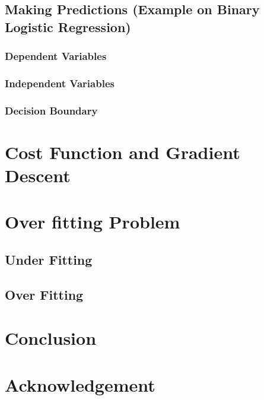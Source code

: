 \documentclass[conference]{IEEEtran}
\begin{document}
\subsection{Making Predictions (Example on Binary Logistic Regression)}

\subsubsection{Dependent Variables}

\subsubsection{Independent Variables}

\subsubsection{Decision Boundary}


\section{Cost Function and Gradient Descent}


\section{Over fitting Problem}
\subsection{Under Fitting}
\subsection{Over Fitting}


\section{Conclusion}



\section*{Acknowledgement}











\end{document}
